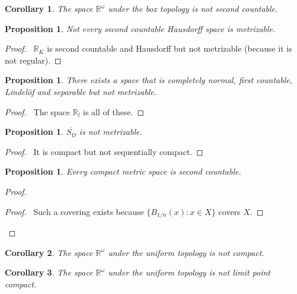 \documentclass{report}
\let\qed\relax
\newtheorem{prop}[lm]{Proposition}
\newtheorem{cor}{Corollary}[lm]
\theoremstyle{definition}
\begin{document}
 \begin{cor}
   The space $\mathbb{R}^\omega$ under the box topology is not second countable.
 \end{cor}

 \begin{prop}
  Not every second countable Hausdorff space is metrizable.
 \end{prop}

 \begin{proof}
  \pf\ $\mathbb{R}_K$ is second countable and Hausdorff but not metrizable
(because it is not regular). \qed
 \end{proof}

  \begin{prop}
   There exists a space that is completely normal, first countable,
Lindel\"{o}f and separable but not metrizable.
 \end{prop}

 \begin{proof}
   \pf\ The space $\mathbb{R}_l$ is all of these. \qed
 \end{proof}

  \begin{prop}
   $\overline{S_\Omega}$ is not metrizable.
 \end{prop}

 \begin{proof}
  \pf\ It is compact but not sequentially compact. \qed
 \end{proof}

  \begin{prop}
  Every compact metric space is second countable.
 \end{prop}

 \begin{proof}
  \pf
\begin{proof}
  \pf\ Such a covering exists because $\{ B_{1/n}(x) : x \in X\}$ covers $X$.
\end{proof}
\qed
 \end{proof}

 \begin{cor}
   The space $\mathbb{R}^\omega$ under the uniform topology is not compact.
 \end{cor}

 \begin{cor}
   The space $\mathbb{R}^\omega$ under the uniform topology is not limit
point compact.
 \end{cor}
\end{document}
